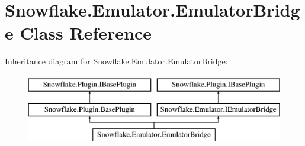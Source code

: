 \hypertarget{class_snowflake_1_1_emulator_1_1_emulator_bridge}{}\section{Snowflake.\+Emulator.\+Emulator\+Bridge Class Reference}
\label{class_snowflake_1_1_emulator_1_1_emulator_bridge}
Inheritance diagram for Snowflake.\+Emulator.\+Emulator\+Bridge\+:\begin{figure}[H]
\begin{center}
\leavevmode
\includegraphics[height=3.000000cm]{class_snowflake_1_1_emulator_1_1_emulator_bridge}
\end{center}
\end{figure}
